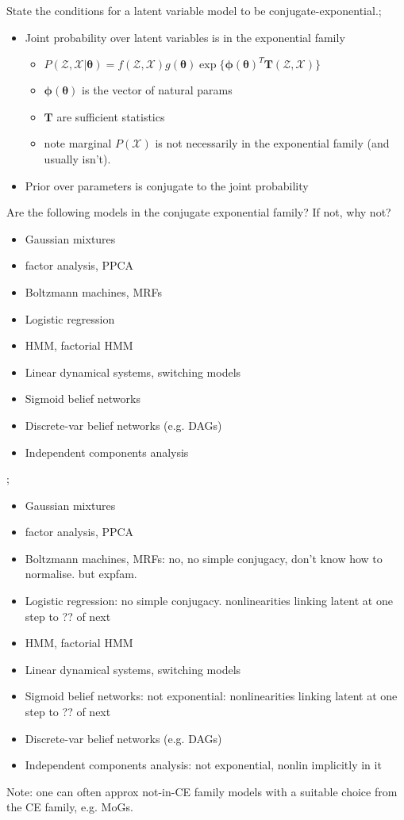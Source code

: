 \documentclass{article}
\begin{document}
State the conditions for a latent variable model to be conjugate-exponential.; \begin{itemize} \item Joint probability over latent variables is in the exponential family \begin{itemize} \item $P(\mathcal{Z, X}|\bm{\theta}) = f(\mathcal{Z, X})g(\bm{\theta})\exp\{\bm{\phi(\theta)}^T\bm{T}(\mathcal{Z,X})\}$ \item $\bm{\phi(\theta)}$ is the vector of natural params \item $\bm{T}$ are sufficient statistics \item note marginal $P(\mathcal{X})$ is not necessarily in the exponential family (and usually isn't).  \end{itemize} \item Prior over parameters is conjugate to the joint probability \end{itemize}

Are the following models in the conjugate exponential family? If not, why not?  \begin{itemize} \item Gaussian mixtures \item factor analysis, PPCA \item Boltzmann machines, MRFs \item Logistic regression \item HMM, factorial HMM \item Linear dynamical systems, switching models \item Sigmoid belief networks \item Discrete-var belief networks (e.g. DAGs) \item Independent components analysis \end{itemize}; \begin{itemize} \item Gaussian mixtures \item factor analysis, PPCA \item Boltzmann machines, MRFs: no, no simple conjugacy, don't know how to normalise. but expfam.  \item Logistic regression: no simple conjugacy. nonlinearities linking latent at one step to ?? of next \item HMM, factorial HMM \item Linear dynamical systems, switching models \item Sigmoid belief networks: not exponential: nonlinearities linking latent at one step to ?? of next \item Discrete-var belief networks (e.g. DAGs) \item Independent components analysis: not exponential, nonlin implicitly in it \end{itemize} Note: one can often approx not-in-CE family models with a suitable choice from the CE family, e.g. MoGs.
\end{document}
